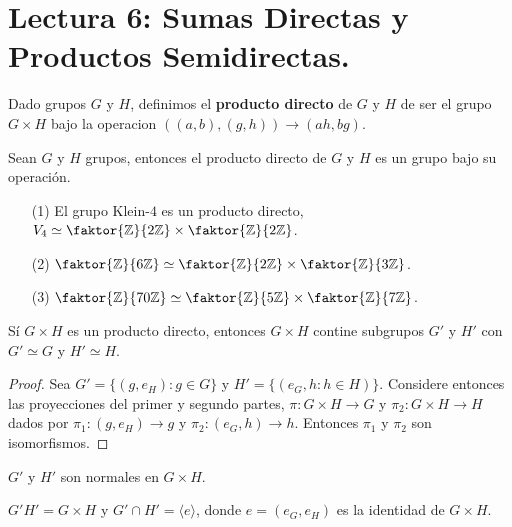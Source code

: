 \section*{Lectura 6: Sumas Directas y Productos Semidirectas.}

\begin{definition}
    Dado grupos $G$ y  $H$, definimos el  \textbf{producto directo} de $G$ y
    $H$ de ser el grupo  $G \times H$ bajo la operacion  $((a,b),(g,h))
    \xrightarrow{} (ah,bg)$.
\end{definition}

\begin{lemma}\label{lemma_6.19}
    Sean $G$ y  $H$ grupos, entonces el producto directo de  $G$ y  $H$ es un
    grupo bajo su operaci\'on.
\end{lemma}

\begin{example}\label{}
    \begin{enumerate}
        \item[(1)] El grupo Klein-$4$ es un producto directo, $V_4 \simeq
            \faktor{\Z}{2\Z} \times \faktor{\Z}{2\Z}$.

        \item[(2)] $\faktor{\Z}{6\Z} \simeq \faktor{\Z}{2\Z} \times
            \faktor{\Z}{3\Z}$.

        \item[(3)] $\faktor{\Z}{70\Z} \simeq \faktor{\Z}{5\Z} \times
            \faktor{\Z}{7\Z}$.
    \end{enumerate}
\end{example}

\begin{lemma}\label{lemma_6.20}
    S\'i $G \times H$ es un producto directo, entonces  $G \times H$ contine
    subgrupos  $G'$ y  $H'$ con  $G' \simeq G$ y  $H' \simeq H$.
\end{lemma}
\begin{proof}
    Sea $G'=\{(g,e_H) : g \in G\}$ y $H'=\{(e_G,h : h \in H)\}$. Considere
    entonces las proyecciones del primer y segundo partes, $\pi:G \times H
    \xrightarrow{} G$ y $\pi_2:G \times H \xrightarrow{} H$ dados por
    $\pi_1:(g,e_H) \xrightarrow{} g$ y $\pi_2:(e_G,h) \xrightarrow{} h$.
    Entonces  $\pi_1$ y $\pi_2$ son isomorfismos.
\end{proof}
\begin{corollary}
    $G'$ y  $H'$ son normales en  $G \times H$.
\end{corollary}
\begin{corollary}
    $G'H'=G \times H$ y  $G' \cap H'=\langle e \rangle$, donde $e=(e_G,e_H)$ es
    la identidad de $G \times H$.
\end{corollary}

